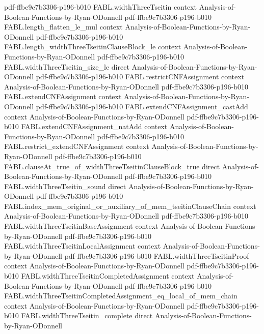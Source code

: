 \begin{theorem}
  {pdf-ffbe9c7b3306-p196-b010}
\proofstep
  {FABL.widthThreeTseitin}
  {context}
  {Analysis-of-Boolean-Functions-by-Ryan-ODonnell}
  {pdf-ffbe9c7b3306-p196-b010}
\proofstep
  {FABL.length_flatten_le_mul}
  {context}
  {Analysis-of-Boolean-Functions-by-Ryan-ODonnell}
  {pdf-ffbe9c7b3306-p196-b010}
\proofstep
  {FABL.length_widthThreeTseitinClauseBlock_le}
  {context}
  {Analysis-of-Boolean-Functions-by-Ryan-ODonnell}
  {pdf-ffbe9c7b3306-p196-b010}
\proofstep
  {FABL.widthThreeTseitin_size_le}
  {direct}
  {Analysis-of-Boolean-Functions-by-Ryan-ODonnell}
  {pdf-ffbe9c7b3306-p196-b010}
\proofstep
  {FABL.restrictCNFAssignment}
  {context}
  {Analysis-of-Boolean-Functions-by-Ryan-ODonnell}
  {pdf-ffbe9c7b3306-p196-b010}
\proofstep
  {FABL.extendCNFAssignment}
  {context}
  {Analysis-of-Boolean-Functions-by-Ryan-ODonnell}
  {pdf-ffbe9c7b3306-p196-b010}
\proofstep
  {FABL.extendCNFAssignment_castAdd}
  {context}
  {Analysis-of-Boolean-Functions-by-Ryan-ODonnell}
  {pdf-ffbe9c7b3306-p196-b010}
\proofstep
  {FABL.extendCNFAssignment_natAdd}
  {context}
  {Analysis-of-Boolean-Functions-by-Ryan-ODonnell}
  {pdf-ffbe9c7b3306-p196-b010}
\proofstep
  {FABL.restrict_extendCNFAssignment}
  {context}
  {Analysis-of-Boolean-Functions-by-Ryan-ODonnell}
  {pdf-ffbe9c7b3306-p196-b010}
\proofstep
  {FABL.clauseAt_true_of_widthThreeTseitinClauseBlock_true}
  {direct}
  {Analysis-of-Boolean-Functions-by-Ryan-ODonnell}
  {pdf-ffbe9c7b3306-p196-b010}
\proofstep
  {FABL.widthThreeTseitin_sound}
  {direct}
  {Analysis-of-Boolean-Functions-by-Ryan-ODonnell}
  {pdf-ffbe9c7b3306-p196-b010}
\proofstep
  {FABL.index_mem_original_or_auxiliary_of_mem_tseitinClauseChain}
  {context}
  {Analysis-of-Boolean-Functions-by-Ryan-ODonnell}
  {pdf-ffbe9c7b3306-p196-b010}
\proofstep
  {FABL.widthThreeTseitinBaseAssignment}
  {context}
  {Analysis-of-Boolean-Functions-by-Ryan-ODonnell}
  {pdf-ffbe9c7b3306-p196-b010}
\proofstep
  {FABL.widthThreeTseitinLocalAssignment}
  {context}
  {Analysis-of-Boolean-Functions-by-Ryan-ODonnell}
  {pdf-ffbe9c7b3306-p196-b010}
\proofstep
  {FABL.widthThreeTseitinProof}
  {context}
  {Analysis-of-Boolean-Functions-by-Ryan-ODonnell}
  {pdf-ffbe9c7b3306-p196-b010}
\proofstep
  {FABL.widthThreeTseitinCompletedAssignment}
  {context}
  {Analysis-of-Boolean-Functions-by-Ryan-ODonnell}
  {pdf-ffbe9c7b3306-p196-b010}
\proofstep
  {FABL.widthThreeTseitinCompletedAssignment_eq_local_of_mem_chain}
  {context}
  {Analysis-of-Boolean-Functions-by-Ryan-ODonnell}
  {pdf-ffbe9c7b3306-p196-b010}
\proofstep
  {FABL.widthThreeTseitin_complete}
  {direct}
  {Analysis-of-Boolean-Functions-by-Ryan-ODonnell}

\end{theorem}
